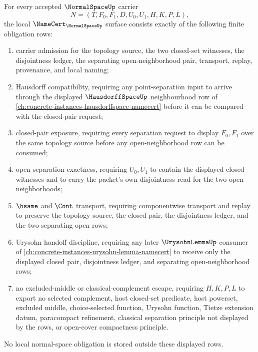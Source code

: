 \begin{theorem}
\label{thm:normal-space-namecert-obligations}
\label{thm:normal-space-namecert-obligation-surface}
For every accepted $\NormalSpaceUp$ carrier
$$
N=(T,F_0,F_1,D,U_0,U_1,H,K,P,L),
$$
the local $\NameCert_{\NormalSpaceUp}$ surface consists exactly of the following finite obligation rows:
\begin{enumerate}
\item carrier admission for the topology source, the two closed-set witnesses, the disjointness ledger, the separating open-neighborhood pair, transport, replay, provenance, and local naming;
\item Hausdorff compatibility, requiring any point-separation input to arrive through the displayed $\HausdorffSpaceUp$ neighbourhood row of \autoref{ch:concrete-instances-hausdorffspace-namecert} before it can be compared with the closed-pair request;
\item closed-pair exposure, requiring every separation request to display $F_0,F_1$ over the same topology source before any open-neighborhood row can be consumed;
\item open-separation exactness, requiring $U_0,U_1$ to contain the displayed closed witnesses and to carry the packet's own disjointness read for the two open neighborhoods;
\item $\hsame$ and $\Cont$ transport, requiring componentwise transport and replay to preserve the topology source, the closed pair, the disjointness ledger, and the two separating open rows;
\item Urysohn handoff discipline, requiring any later $\UrysohnLemmaUp$ consumer of \autoref{ch:concrete-instances-urysohn-lemma-namecert} to receive only the displayed closed pair, disjointness ledger, and separating open-neighborhood rows;
\item no excluded-middle or classical-complement escape, requiring $H,K,P,L$ to export no selected complement, host closed-set predicate, host powerset, excluded middle, choice-selected function, Urysohn function, Tietze extension datum, paracompact refinement, classical separation principle not displayed by the rows, or open-cover compactness principle.
\end{enumerate}
No local normal-space obligation is stored outside these displayed rows.
\end{theorem}
